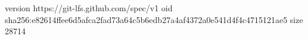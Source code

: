 version https://git-lfs.github.com/spec/v1
oid sha256:e82614ffee6d5afca2fad73a64c5b6edb27a4af4372a0e541d4f4c4715121ae5
size 28714

